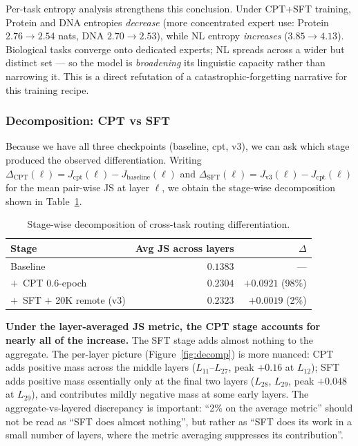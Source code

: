 \documentclass[11pt]{article}
\begin{document}
Per-task entropy analysis strengthens this conclusion. Under CPT+SFT training, Protein and DNA entropies \emph{decrease} (more concentrated expert use: Protein $2.76 \to 2.54$ nats, DNA $2.70 \to 2.53$), while NL entropy \emph{increases} ($3.85 \to 4.13$). Biological tasks converge onto dedicated experts; NL spreads across a wider but distinct set --- so the model is \emph{broadening} its linguistic capacity rather than narrowing it. This is a direct refutation of a catastrophic-forgetting narrative for this training recipe.

\subsubsection{Decomposition: CPT vs SFT}
\label{sec:moe-decomp}

Because we have all three checkpoints (baseline, cpt, v3), we can ask which stage produced the observed differentiation. Writing $\Delta_{\mathrm{CPT}}(\ell) = J_{\mathrm{cpt}}(\ell) - J_{\mathrm{baseline}}(\ell)$ and $\Delta_{\mathrm{SFT}}(\ell) = J_{\mathrm{v3}}(\ell) - J_{\mathrm{cpt}}(\ell)$ for the mean pair-wise JS at layer $\ell$, we obtain the stage-wise decomposition shown in Table~\ref{tab:decomp}.

\begin{table}[H]
\centering
\small
\caption{Stage-wise decomposition of cross-task routing differentiation.}
\label{tab:decomp}
\begin{tabular}{lrr}
\toprule
\textbf{Stage} & \textbf{Avg JS across layers} & \textbf{$\Delta$} \\
\midrule
Baseline                         & $0.1383$ & ---       \\
$+\,$ CPT 0.6-epoch              & $0.2304$ & $\mathbf{+0.0921}$ (98\%) \\
$+\,$ SFT $+$ 20K remote (v3)    & $0.2323$ & $+0.0019$ (2\%) \\
\bottomrule
\end{tabular}
\end{table}

\textbf{Under the layer-averaged JS metric, the CPT stage accounts for nearly all of the increase.} The SFT stage adds almost nothing to the aggregate. The per-layer picture (Figure~\ref{fig:decomp}) is more nuanced: CPT adds positive mass across the middle layers ($L_{11}$--$L_{27}$, peak $+0.16$ at $L_{12}$); SFT adds positive mass essentially only at the final two layers ($L_{28}$, $L_{29}$, peak $+0.048$ at $L_{29}$), and contributes mildly negative mass at some early layers. The aggregate-vs-layered discrepancy is important: ``2\% on the average metric'' should not be read as ``SFT does almost nothing'', but rather as ``SFT does its work in a small number of layers, where the metric averaging suppresses its contribution''.
\end{document}

